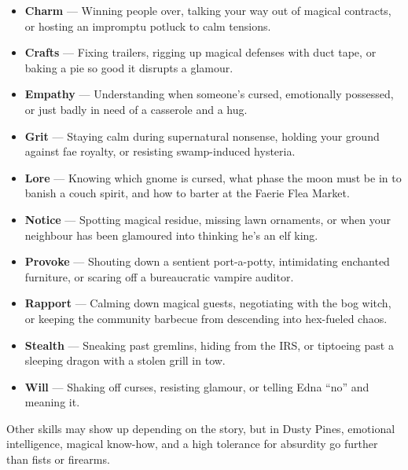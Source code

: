 \begin{itemize}
  \item \textbf{Charm} --- Winning people over, talking your way out of magical contracts, or hosting an impromptu potluck to calm tensions.
  
  \item \textbf{Crafts} --- Fixing trailers, rigging up magical defenses with duct tape, or baking a pie so good it disrupts a glamour.
  
  \item \textbf{Empathy} --- Understanding when someone’s cursed, emotionally possessed, or just badly in need of a casserole and a hug.
  
  \item \textbf{Grit} --- Staying calm during supernatural nonsense, holding your ground against fae royalty, or resisting swamp-induced hysteria.
  
  \item \textbf{Lore} --- Knowing which gnome is cursed, what phase the moon must be in to banish a couch spirit, and how to barter at the Faerie Flea Market.
  
  \item \textbf{Notice} --- Spotting magical residue, missing lawn ornaments, or when your neighbour has been glamoured into thinking he’s an elf king.
  
  \item \textbf{Provoke} --- Shouting down a sentient port-a-potty, intimidating enchanted furniture, or scaring off a bureaucratic vampire auditor.
  
  \item \textbf{Rapport} --- Calming down magical guests, negotiating with the bog witch, or keeping the community barbecue from descending into hex-fueled chaos.
  
  \item \textbf{Stealth} --- Sneaking past gremlins, hiding from the IRS, or tiptoeing past a sleeping dragon with a stolen grill in tow.
  
  \item \textbf{Will} --- Shaking off curses, resisting glamour, or telling Edna “no” and meaning it.
\end{itemize}

Other skills may show up depending on the story, but in Dusty Pines, emotional intelligence, magical know-how, and a high tolerance for absurdity go further than fists or firearms.



